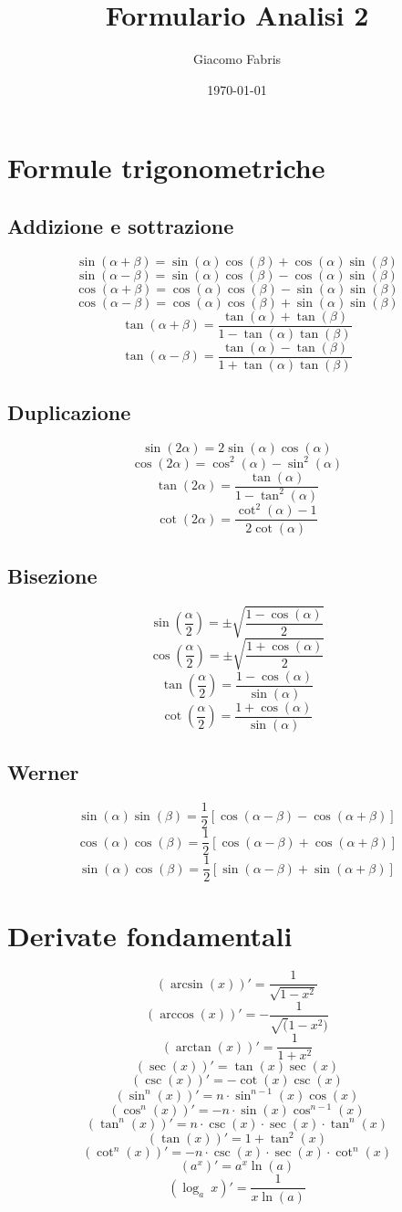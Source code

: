 \documentclass[a4paper,portrait,columns=3,5pt]{cheatsheet}
\title{Formulario Analisi 2}
\author{Giacomo Fabris}
\date{\today}
\begin{document}
\maketitle

\section{Formule trigonometriche}
\subsection{Addizione e sottrazione}
$$\sin (\alpha + \beta) = \sin(\alpha) \cos(\beta) + \cos(\alpha)\sin(\beta)$$
$$\sin(\alpha - \beta) = \sin(\alpha) \cos(\beta) - \cos(\alpha)\sin(\beta)$$
$$\cos(\alpha + \beta) = \cos(\alpha) \cos(\beta) - \sin(\alpha) \sin(\beta)$$
$$\cos(\alpha - \beta) = \cos(\alpha) \cos(\beta) + \sin(\alpha) \sin(\beta)$$
$$\tan(\alpha + \beta) = \frac{\tan(\alpha) + \tan(\beta)}{1 - \tan(\alpha)\tan(\beta)}$$
$$\tan(\alpha - \beta) = \frac{\tan(\alpha) - \tan(\beta)}{1 + \tan(\alpha)\tan(\beta)}$$
\subsection{Duplicazione}
$$\sin(2\alpha) = 2\sin(\alpha)\cos(\alpha)$$
$$\cos(2\alpha) = \cos^2 (\alpha) - \sin^2 (\alpha)$$
$$\tan(2\alpha) = \frac{\tan(\alpha)}{1 - \tan^2(\alpha)}$$
$$\cot(2\alpha) = \frac{\cot^2(\alpha) - 1}{2\cot(\alpha)}$$
\subsection{Bisezione}
$$\sin\left(\frac{\alpha}{2}\right) = \pm \sqrt{\frac{1 - \cos(\alpha)}{2}}$$
$$\cos\left(\frac{\alpha}{2}\right) = \pm \sqrt{\frac{1 + \cos(\alpha)}{2}}$$
$$\tan\left(\frac{\alpha}{2}\right) = {\frac{1 - \cos(\alpha)}{\sin(\alpha)}}$$
$$\cot\left(\frac{\alpha}{2}\right) = {\frac{1 + \cos(\alpha)}{\sin(\alpha)}}$$
\subsection{Werner}
$$\sin(\alpha)\sin(\beta) = \frac{1}{2} \left[\cos(\alpha - \beta) - \cos(\alpha + \beta)\right]$$
$$\cos(\alpha)\cos(\beta) = \frac{1}{2} \left[\cos(\alpha - \beta) + \cos(\alpha + \beta)\right]$$
$$\sin(\alpha)\cos(\beta) = \frac{1}{2} \left[\sin(\alpha - \beta) + \sin(\alpha + \beta)\right]$$

\section{Derivate fondamentali}
$$ (\arcsin(x))' = \frac{1}{\sqrt{1 - x^2}}$$
$$ (\arccos(x))' = - \frac{1}{\sqrt(1 - x^2)}$$
$$ (\arctan(x))' = \frac{1}{1 + x^2}$$
$$ (\sec(x))' = \tan(x)\sec(x)$$
$$ (\csc(x))' = -\cot(x)\csc(x)$$
$$ (\sin^n(x))' = n\cdot \sin^{n-1}(x)\cos(x)$$
$$ (\cos^n(x))' = -n\cdot \sin(x)\cos^{n-1}(x)$$
$$ (\tan^n(x))' = n \cdot \csc(x) \cdot \sec(x) \cdot \tan^n (x)$$
$$ (\tan(x))' = 1 + \tan^2(x) $$
$$ (\cot^n(x))' = - n \cdot \csc(x) \cdot \sec(x) \cdot \cot^n (x)$$
$$ (a^x)' = a^x \ln(a)$$
$$ (\log_a~x )' = \frac{1}{x\ln(a)}$$
\end{document}

